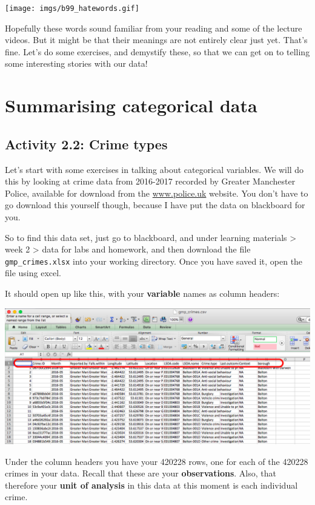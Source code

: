 \documentclass[
]{book}
\begin{document}
\texttt{[image: imgs/b99\_hatewords.gif]}

Hopefully these words sound familiar from your reading and some of the lecture videos. But it might be that their meanings are not entirely clear just yet. That's fine. Let's do some exercises, and demystify these, so that we can get on to telling some interesting stories with our data!

\hypertarget{summarising-categorical-data}{%
\section{Summarising categorical data}\label{summarising-categorical-data}}

\hypertarget{activity-2.2-crime-types}{%
\subsection{Activity 2.2: Crime types}\label{activity-2.2-crime-types}}

Let's start with some exercises in talking about categorical variables. We will do this by looking at crime data from 2016-2017 recorded by Greater Manchester Police, available for download from the \href{https://www.police.uk/}{www.police.uk} website. You don't have to go download this yourself though, because I have put the data on blackboard for you.

So to find this data set, just go to blackboard, and under learning materials \textgreater{} week 2 \textgreater{} data for labs and homework, and then download the file \texttt{gmp\_crimes.xlsx} into your working directory. Once you have saved it, open the file using excel.

It should open up like this, with your \textbf{variable} names as column headers:

\includegraphics{imgs/open_gmp_crimes.png}

Under the column headers you have your 420228 rows, one for each of the 420228 crimes in your data. Recall that these are your \textbf{observations}. Also, that therefore your \textbf{unit of analysis} in this data at this moment is each individual crime.
\end{document}
